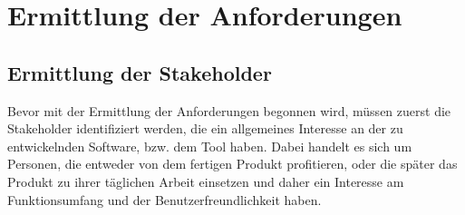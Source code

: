 \section{Ermittlung der Anforderungen}
\subsection{Ermittlung der Stakeholder}
Bevor mit der Ermittlung der Anforderungen begonnen wird, müssen zuerst die Stakeholder identifiziert werden, die ein allgemeines Interesse an der zu entwickelnden Software, bzw. dem Tool haben. Dabei handelt es sich um Personen, die entweder von dem fertigen Produkt profitieren, oder die später das Produkt zu ihrer täglichen Arbeit einsetzen und daher ein Interesse am Funktionsumfang und der Benutzerfreundlichkeit haben. 

